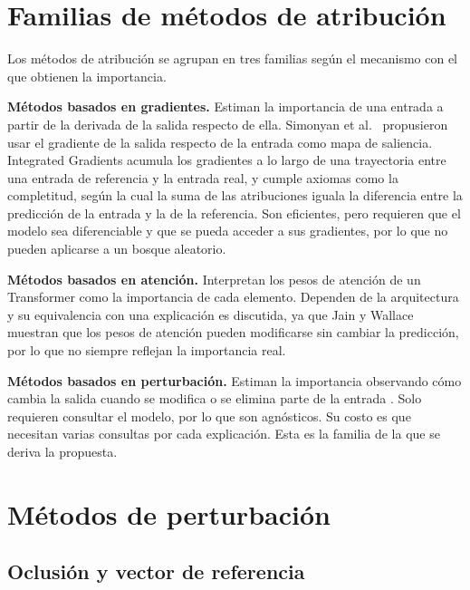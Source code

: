 \section{Familias de métodos de atribución}
\label{sec:mt_familias}

Los métodos de atribución se agrupan en tres familias según el mecanismo con el que obtienen la importancia.

\textbf{Métodos basados en gradientes.} Estiman la importancia de una entrada a partir de la derivada de la salida respecto de ella. Simonyan et al.\ \cite{simonyan2014} propusieron usar el gradiente de la salida respecto de la entrada como mapa de saliencia. Integrated Gradients \cite{sundararajan2017} acumula los gradientes a lo largo de una trayectoria entre una entrada de referencia y la entrada real, y cumple axiomas como la completitud, según la cual la suma de las atribuciones iguala la diferencia entre la predicción de la entrada y la de la referencia. Son eficientes, pero requieren que el modelo sea diferenciable y que se pueda acceder a sus gradientes, por lo que no pueden aplicarse a un bosque aleatorio.

\textbf{Métodos basados en atención.} Interpretan los pesos de atención de un Transformer como la importancia de cada elemento. Dependen de la arquitectura y su equivalencia con una explicación es discutida, ya que Jain y Wallace \cite{jain2019} muestran que los pesos de atención pueden modificarse sin cambiar la predicción, por lo que no siempre reflejan la importancia real.

\textbf{Métodos basados en perturbación.} Estiman la importancia observando cómo cambia la salida cuando se modifica o se elimina parte de la entrada \cite{zeiler2014, ribeiro2016}. Solo requieren consultar el modelo, por lo que son agnósticos. Su costo es que necesitan varias consultas por cada explicación. Esta es la familia de la que se deriva la propuesta.

\section{Métodos de perturbación}
\label{sec:mt_perturbacion}

\subsection{Oclusión y vector de referencia}
\label{sec:mt_oclusion}

